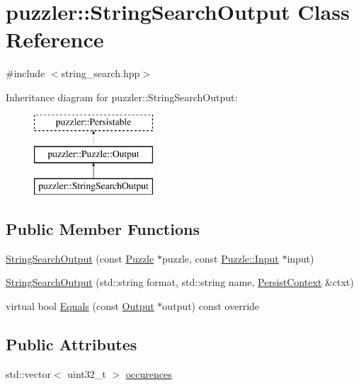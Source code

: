 \hypertarget{a00033}{}\section{puzzler\+:\+:String\+Search\+Output Class Reference}
\label{a00033}


{\ttfamily \#include $<$string\+\_\+search.\+hpp$>$}

Inheritance diagram for puzzler\+:\+:String\+Search\+Output\+:\begin{figure}[H]
\begin{center}
\leavevmode
\includegraphics[height=3.000000cm]{a00033}
\end{center}
\end{figure}
\subsection*{Public Member Functions}
\begin{DoxyCompactItemize}
\item 
\hyperlink{a00033_a2a80cb9e94563d5b9d6236ef138854f6}{String\+Search\+Output} (const \hyperlink{a00026}{Puzzle} $\ast$puzzle, const \hyperlink{a00009}{Puzzle\+::\+Input} $\ast$input)
\item 
\hyperlink{a00033_aeb630c277c2a959bbd960b3e95fcabb8}{String\+Search\+Output} (std\+::string format, std\+::string name, \hyperlink{a00025}{Persist\+Context} \&ctxt)
\item 
virtual bool \hyperlink{a00033_acccc0a6ac66b94b3c3b2177ed273a35a}{Equals} (const \hyperlink{a00023_aa605318d3632c1b359c07745bdf17e83}{Output} $\ast$output) const override
\end{DoxyCompactItemize}
\subsection*{Public Attributes}
\begin{DoxyCompactItemize}
\item 
std\+::vector$<$ uint32\+\_\+t $>$ \hyperlink{a00033_aab47434ea6516a925dce019171a60049}{occurences}
\end{DoxyCompactItemize}
